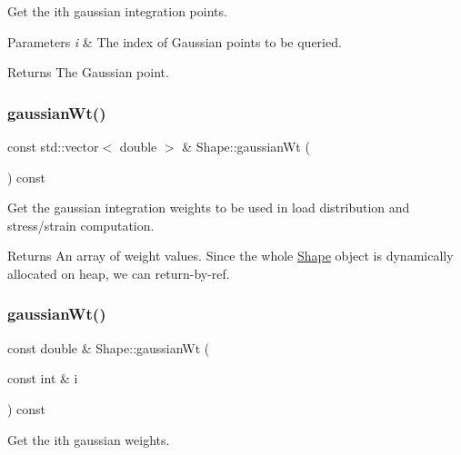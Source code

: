 Get the ith gaussian integration points. 


\begin{DoxyParams}{Parameters}
{\em i} & The index of Gaussian points to be queried. \\
\hline
\end{DoxyParams}
\begin{DoxyReturn}{Returns}
The Gaussian point. 
\end{DoxyReturn}
\mbox{\label{class_shape_aa6112974b77db75f70e5a7367d30ed78}} 
\subsubsection{\texorpdfstring{gaussian\+Wt()}{gaussianWt()}\hspace{0.1cm}{\footnotesize\ttfamily [1/2]}}
{\footnotesize\ttfamily const std\+::vector$<$ double $>$ \& Shape\+::gaussian\+Wt (\begin{DoxyParamCaption}{ }\end{DoxyParamCaption}) const}



Get the gaussian integration weights to be used in load distribution and stress/strain computation. 

\begin{DoxyReturn}{Returns}
An array of weight values. Since the whole \mbox{\hyperlink{class_shape}{Shape}} object is dynamically allocated on heap, we can return-\/by-\/ref. 
\end{DoxyReturn}
\mbox{\label{class_shape_ab59598c42a7ecbe41998820bf43e1307}} 
\subsubsection{\texorpdfstring{gaussian\+Wt()}{gaussianWt()}\hspace{0.1cm}{\footnotesize\ttfamily [2/2]}}
{\footnotesize\ttfamily const double \& Shape\+::gaussian\+Wt (\begin{DoxyParamCaption}\item[{const int \&}]{i }\end{DoxyParamCaption}) const}



Get the ith gaussian weights. 


